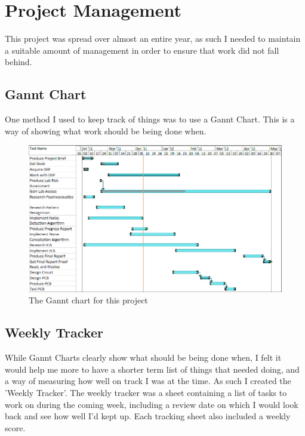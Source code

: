 \section{Project Management}
This project was spread over almost an entire year, as such I needed to maintain a suitable amount of management in order to ensure that work did not fall behind.

\subsection{Gannt Chart}
One method I used to keep track of things was to use a Gannt Chart. This is a way of showing what work should be being done when.

\begin{figure}[h]
	\centering
	\includegraphics[width=\textwidth]{./img/gannt.png}
	\caption{The Gannt chart for this project}
	\label{fig:gannt}
\end{figure}

\subsection{Weekly Tracker}
While Gannt Charts clearly show what should be being done when, I felt it would help me more to have a shorter term list of things that needed doing, and a way of measuring how well on track I was at the time. As such I created the 'Weekly Tracker'.
The weekly tracker was a sheet containing a list of tasks to work on during the coming week, including a review date on which I would look back and see how well I'd kept up. Each tracking sheet also included a weekly score.


